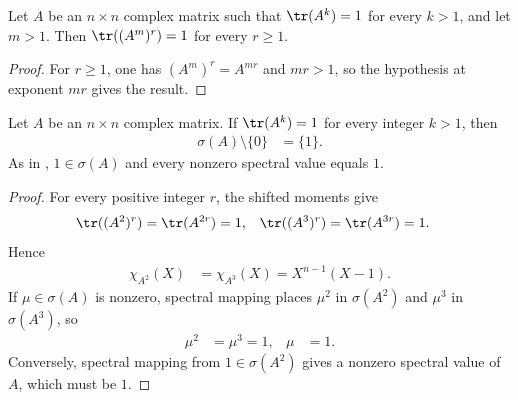 \begin{lemma}
    \label{thm:mpu_shifted_trace_power_moments}
    \leanok
    Let $A$ be an $n\times n$ complex matrix such that $\tr(A^k)=1$ for every
    $k>1$, and let $m>1$.  Then $\tr((A^m)^r)=1$ for every $r\ge1$.
\end{lemma}

\begin{proof}\leanok
    For $r\ge1$, one has $(A^m)^r=A^{mr}$ and $mr>1$, so the hypothesis at
    exponent $mr$ gives the result.
\end{proof}

\begin{lemma}
    \label{thm:mpu_shifted_trace_power_spectrum}
    \leanok
    Let $A$ be an $n\times n$ complex matrix. If $\tr(A^k)=1$ for every
    integer $k>1$, then
    \begin{align}
        \sigma(A)\setminus\{0\} & =\{1\}.
    \end{align}
    As in \cite[Proposition~III.1]{Cirac2017MPU}, $1\in\sigma(A)$ and every nonzero spectral value equals
    $1$.
\end{lemma}

\begin{proof}\leanok
    For every positive integer $r$, the shifted moments give
    \begin{align}
        \tr((A^2)^r) & =\tr(A^{2r})=1,
                     & \tr((A^3)^r)    & =\tr(A^{3r})=1.
    \end{align}
    Hence
    \begin{align}
        \chi_{A^2}(X) & =\chi_{A^3}(X)=X^{n-1}(X-1).
    \end{align}
    If $\mu\in\sigma(A)$ is nonzero, spectral mapping places $\mu^2$ in
    $\sigma(A^2)$ and $\mu^3$ in $\sigma(A^3)$, so
    \begin{align}
        \mu^2 & =\mu^3=1,
              & \mu       & =1.
    \end{align}
    Conversely, spectral mapping from $1\in\sigma(A^2)$ gives a nonzero
    spectral value of $A$, which must be $1$.
\end{proof}

